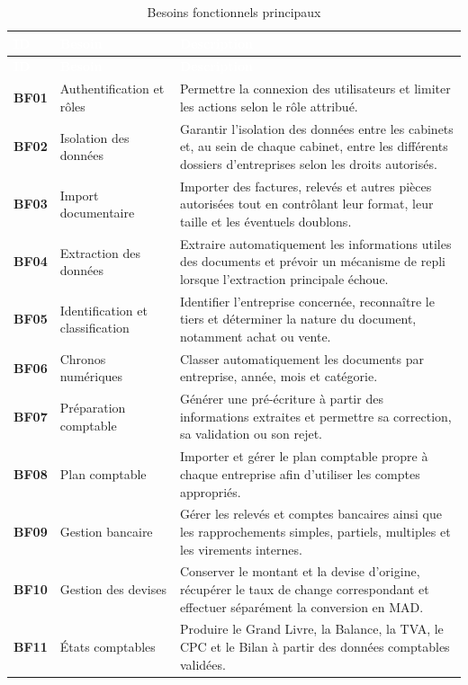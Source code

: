 \documentclass[12pt,a4paper,oneside]{report}
\newcommand{\TableSetup}{%
  \arrayrulecolor{ComptaTableLine}%
  \setlength{\arrayrulewidth}{0.45pt}%
  \renewcommand{\arraystretch}{1.18}%
}
\newcommand{\TableHead}[1]{\textcolor{white}{\textbf{#1}}}
\newcommand{\TableId}[1]{\textcolor{ComptaGreen}{\textbf{#1}}}
\begin{document}
\TableSetup
\begin{longtable}{|L{1.4cm}|L{5cm}|L{8cm}|}
\caption{Besoins fonctionnels principaux}\label{tab:bf}\\
\toprule
{}\TableHead{ID} & \TableHead{Besoin} & \TableHead{Description} \\
\midrule
\endfirsthead
\toprule
{}\TableHead{ID} & \TableHead{Besoin} & \TableHead{Description} \\
\midrule
\endhead
\TableId{BF01} & Authentification et rôles & Permettre la connexion des utilisateurs et limiter les actions selon le rôle attribué. \\
\TableId{BF02} & Isolation des données & Garantir l'isolation des données entre les cabinets et, au sein de chaque cabinet, entre les différents dossiers d'entreprises selon les droits autorisés. \\
\TableId{BF03} & Import documentaire & Importer des factures, relevés et autres pièces autorisées tout en contrôlant leur format, leur taille et les éventuels doublons. \\
\TableId{BF04} & Extraction des données & Extraire automatiquement les informations utiles des documents et prévoir un mécanisme de repli lorsque l'extraction principale échoue. \\
\TableId{BF05} & Identification et classification & Identifier l'entreprise concernée, reconnaître le tiers et déterminer la nature du document, notamment achat ou vente. \\
\TableId{BF06} & Chronos numériques & Classer automatiquement les documents par entreprise, année, mois et catégorie. \\
\TableId{BF07} & Préparation comptable & Générer une pré-écriture à partir des informations extraites et permettre sa correction, sa validation ou son rejet. \\
\TableId{BF08} & Plan comptable & Importer et gérer le plan comptable propre à chaque entreprise afin d'utiliser les comptes appropriés. \\
\TableId{BF09} & Gestion bancaire & Gérer les relevés et comptes bancaires ainsi que les rapprochements simples, partiels, multiples et les virements internes. \\
\TableId{BF10} & Gestion des devises & Conserver le montant et la devise d'origine, récupérer le taux de change correspondant et effectuer séparément la conversion en MAD. \\
\TableId{BF11} & États comptables & Produire le Grand Livre, la Balance, la TVA, le CPC et le Bilan à partir des données comptables validées. \\

\end{longtable}
\end{document}
